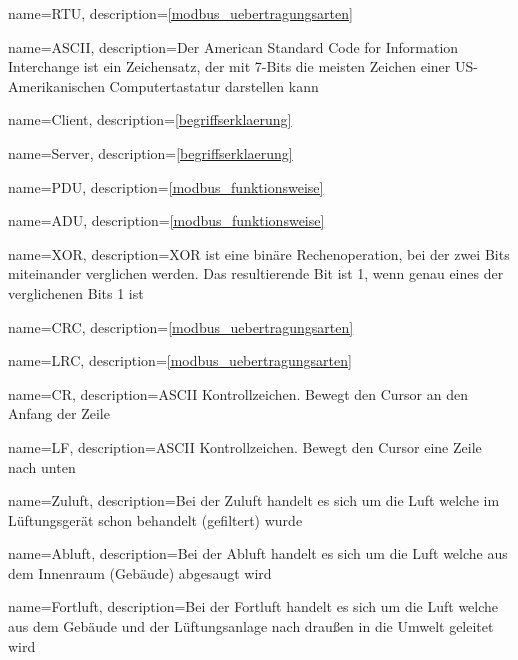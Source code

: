 {
	name=RTU,
	description={\ref{modbus_uebertragungsarten} }
}

{
	name=ASCII,
	description={Der American Standard Code for Information Interchange ist ein Zeichensatz, der mit 7-Bits die meisten Zeichen einer US-Amerikanischen Computertastatur darstellen kann \cite{seo_kueche_ascii:o.J.}}
}

{
	name=Client,
	description={\ref{begriffserklaerung} }
}

{
	name=Server,
	description={\ref{begriffserklaerung} }
}

{
	name=PDU,
	description={\ref{modbus_funktionsweise} }
}

{
	name=ADU,
	description={\ref{modbus_funktionsweise} }
}

{
	name=XOR,
	description={XOR ist eine binäre Rechenoperation, bei der zwei Bits miteinander verglichen werden. Das resultierende Bit ist 1, wenn genau eines der verglichenen Bits 1 ist}
}

{
	name=CRC,
	description={\ref{modbus_uebertragungsarten} }
}

{
	name=LRC,
	description={\ref{modbus_uebertragungsarten} }
}

{
	name=CR,
	description={ASCII Kontrollzeichen. Bewegt den Cursor an den Anfang der Zeile \cite{Mozilla_CRLF:2023}}
}

{
	name=LF,
	description={ASCII Kontrollzeichen. Bewegt den Cursor eine Zeile nach unten \cite{Mozilla_CRLF:2023}}
}

{
	name=Zuluft,
	description={Bei der Zuluft handelt es sich um die Luft welche im Lüftungsgerät schon behandelt (gefiltert) wurde}
}

{
	name=Abluft,
	description={Bei der Abluft handelt es sich um die Luft welche aus dem Innenraum (Gebäude) abgesaugt wird}
}

{
	name=Fortluft,
	description={Bei der Fortluft handelt es sich um die Luft welche aus dem Gebäude und der Lüftungsanlage nach draußen in die Umwelt geleitet wird}
}

